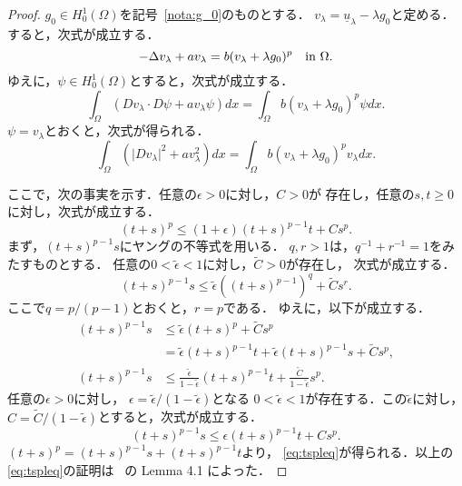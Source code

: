 \begin{proof}
 $g_0 \in H_0^1(\Omega)$を記号~\ref{nota:g_0}のものとする．
 $v_\lambda = \underline{u}_\lambda - \lambda g_0$と定める．
 すると，次式が成立する．
 \[
  -\Delta v_\lambda + a v_\lambda 
 = b(v_\lambda + \lambda g_0)^p \ \ ~\text{in}~ \Omega.
 \]
 ゆえに，$\psi \in H_0^1(\Omega)$とすると，次式が成立する．
 \[
  \int_\Omega (Dv_\lambda \cdot D\psi + a v_\lambda \psi) dx =
 \int_\Omega b(v_\lambda + \lambda g_0)^p \psi dx.
 \]
 $\psi = v_\lambda$とおくと，次式が得られる．
 \begin{equation}
  \int_\Omega \left( \lvert Dv_\lambda \rvert^2 + a v_\lambda
               ^2 \right) dx =
  \int_\Omega b(v_\lambda + \lambda g_0)^p v_\lambda dx. \label{eq:v_lambda}
 \end{equation}

 ここで，次の事実を示す．任意の$\epsilon > 0$に対し，$C > 0$が
 存在し，任意の$s, t \geq 0$に対し，次式が成立する．
 \begin{equation}
  (t+s)^p \leq (1 + \epsilon) (t+s)^{p-1} t + C s^p. \label{eq:tspleq}
 \end{equation}
 まず，$(t+s)^{p-1}s$にヤングの不等式を用いる．
 $q, r > 1$は，$q^{-1} + r^{-1} = 1$をみたすものとする．
 任意の$0 < \tilde{\epsilon} < 1$に対し，$\tilde{C} > 0$が存在し，
 次式が成立する．
 \[
  (t+s)^{p-1} s \leq \tilde{\epsilon} \left( (t+s)^{p-1} \right)^q +
 \tilde{C} s^r.
 \]
 ここで$q = p/(p-1)$とおくと，$r = p$である．
 ゆえに，以下が成立する．
 \begin{align*}
  (t+s)^{p-1} s & \leq \tilde{\epsilon} (t+s)^p + \tilde{C} s^p \\
  &= \tilde{\epsilon} (t+s)^{p-1} t + \tilde{\epsilon} (t+s)^{p-1} s 
  + \tilde{C} s^p, \\
  (t+s)^{p-1} s &\leq \frac{\tilde{\epsilon}}{1 - \tilde{\epsilon}}
  (t+s)^{p-1} t + \frac{\tilde{C}}{1 - \tilde{\epsilon}} s^p.
 \end{align*}
 任意の$\epsilon > 0$に対し，
 $\epsilon = \tilde{\epsilon} / (1 - \tilde{\epsilon})$となる
 $0 < \tilde{\epsilon} < 1$が存在する．この$\tilde{\epsilon}$に対し，
 $C = \tilde{C}/ (1 - \tilde{\epsilon})$とすると，次式が成立する．
 \[
  (t+s)^{p-1} s \leq \epsilon (t+s)^{p-1} t + Cs^p.
 \]
 $(t+s)^{p} = (t+s)^{p-1} s + (t+s)^{p-1}t$より，
 \eqref{eq:tspleq}が得られる．以上の\eqref{eq:tspleq}の証明は
 \cite{MR2317491}~の Lemma 4.1 によった．


\end{proof}
